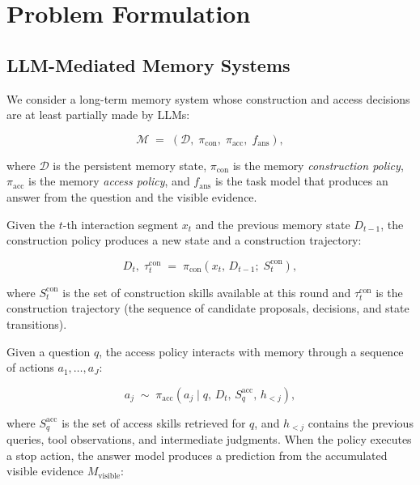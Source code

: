 \documentclass[11pt]{article}
\newcommand{\MM}{\mathcal{M}}
\newcommand{\DD}{\mathcal{D}}
\begin{document}
\section{Problem Formulation}
\label{sec:problem}

\subsection{LLM-Mediated Memory Systems}
\label{sec:prob-sys}

We consider a long-term memory system whose construction and access decisions
are at least partially made by LLMs:

\begin{equation}
\label{eq:system}
\MM \;=\; \left(\DD,\;\pi_{\mathrm{con}},\;\pi_{\mathrm{acc}},\;f_{\mathrm{ans}}\right),
\end{equation}

\noindent where $\DD$ is the persistent memory state, $\pi_{\mathrm{con}}$ is the
memory \emph{construction policy}, $\pi_{\mathrm{acc}}$ is the memory
\emph{access policy}, and $f_{\mathrm{ans}}$ is the task model that produces an
answer from the question and the visible evidence.

Given the $t$-th interaction segment $x_t$ and the previous memory state
$D_{t-1}$, the construction policy produces a new state and a construction
trajectory:

\begin{equation}
\label{eq:construction}
D_t,\;\tau_t^{\mathrm{con}} \;=\; \pi_{\mathrm{con}}\left(x_t,\,D_{t-1};\;S_t^{\mathrm{con}}\right),
\end{equation}

\noindent where $S_t^{\mathrm{con}}$ is the set of construction skills available
at this round and $\tau_t^{\mathrm{con}}$ is the construction trajectory (the
sequence of candidate proposals, decisions, and state transitions).

Given a question $q$, the access policy interacts with memory through a sequence
of actions $a_1,\dots,a_J$:

\begin{equation}
\label{eq:access}
a_j \;\sim\; \pi_{\mathrm{acc}}\left(a_j \mid q,\,D_t,\,S_q^{\mathrm{acc}},\,h_{<j}\right),
\end{equation}

\noindent where $S_q^{\mathrm{acc}}$ is the set of access skills retrieved for
$q$, and $h_{<j}$ contains the previous queries, tool observations, and
intermediate judgments. When the policy executes a stop action, the answer model
produces a prediction from the accumulated visible evidence
$M_{\mathrm{visible}}$:
\end{document}
